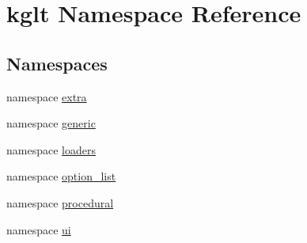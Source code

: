 \hypertarget{namespacekglt}{\section{kglt Namespace Reference}
\label{namespacekglt}
}
\subsection*{Namespaces}
\begin{DoxyCompactItemize}
\item 
namespace \hyperlink{namespacekglt_1_1extra}{extra}
\item 
namespace \hyperlink{namespacekglt_1_1generic}{generic}
\item 
namespace \hyperlink{namespacekglt_1_1loaders}{loaders}
\item 
namespace \hyperlink{namespacekglt_1_1option__list}{option\-\_\-list}
\item 
namespace \hyperlink{namespacekglt_1_1procedural}{procedural}
\item 
namespace \hyperlink{namespacekglt_1_1ui}{ui}
\end{DoxyCompactItemize}
